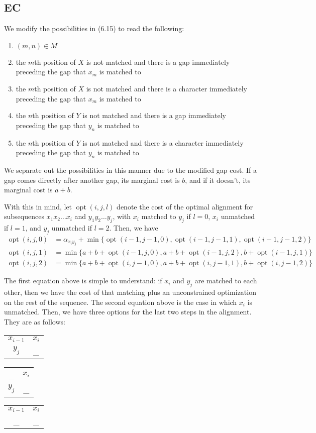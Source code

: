 \documentclass{article}
\DeclareMathOperator{\opt}{opt}
\begin{document}
\subsection*{EC}
We modify the possibilities in (6.15) to read the following:

\begin{enumerate}
\item $(m,n)\in M$
\item the $m$th position of $X$ is not matched and there is a gap immediately preceding the gap that $x_m$ is matched to
\item the $m$th position of $X$ is not matched and there is a character immediately preceding the gap that $x_m$ is matched to
\item the $n$th position of $Y$ is not matched and there is a gap immediately preceding the gap that $y_n$ is matched to
\item the $n$th position of $Y$ is not matched and there is a character immediately preceding the gap that $y_n$ is matched to
\end{enumerate}

We separate out the possibilities in this manner due to the modified gap cost. If a gap comes directly after another gap, its marginal cost is $b$, and if it doesn't, its marginal cost is $a+b$. 

With this in mind, let $\opt(i,j,l)$ denote the cost of the optimal alignment for subsequences $x_1x_2\ldots x_i$ and $y_1y_2\ldots y_j$, with $x_i$ matched to $y_j$ if $l=0$, $x_i$ unmatched if $l=1$, and $y_j$ unmatched if $l=2$. Then, we have 
\begin{align*}
\opt(i,j,0)&=\alpha_{x_iy_j}+\min\{\opt(i-1,j-1,0),\opt(i-1,j-1,1),\opt(i-1,j-1,2)\}\\
\opt(i,j,1)&=\min\{a+b+\opt(i-1,j,0),a+b+\opt(i-1,j,2),b+\opt(i-1,j,1)\}\\
\opt(i,j,2)&=\min\{a+b+\opt(i,j-1,0),a+b+\opt(i,j-1,1),b+\opt(i,j-1,2)\}
\end{align*}

The first equation above is simple to understand: if $x_i$ and $y_j$ are matched to each other, then we have the cost of that matching plus an unconstrained optimization on the rest of the sequence. The second equation above is the case in which $x_i$ is unmatched. Then, we have three options for the last two steps in the alignment. They are as follows:

\begin{tabular}{cc}
$x_{i-1}$ & $x_i$\\
$y_j$ & \_
\end{tabular}
\qquad
\begin{tabular}{cc}
\_ & $x_i$\\
$y_j$ & \_
\end{tabular}
\qquad
\begin{tabular}{cc}
$x_{i-1}$ & $x_i$\\
\_ & \_
\end{tabular}
\end{document}
